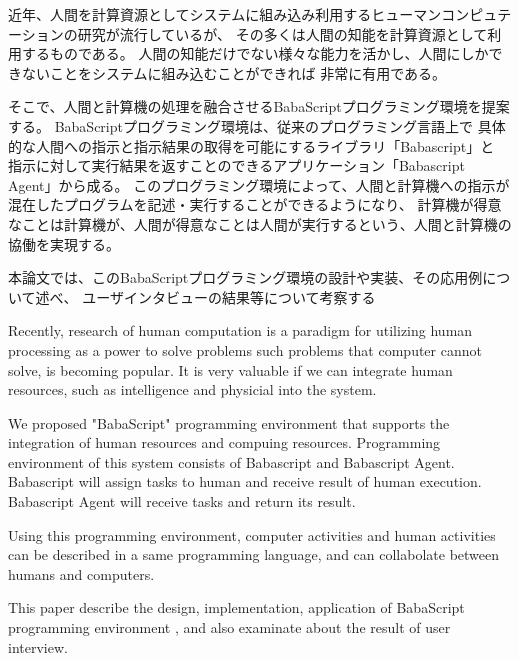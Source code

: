 \begin{jabstract}

近年、人間を計算資源としてシステムに組み込み利用するヒューマンコンピュテーションの研究が流行しているが、
その多くは人間の知能を計算資源として利用するものである。
人間の知能だけでない様々な能力を活かし、人間にしかできないことをシステムに組み込むことができれば
非常に有用である。

そこで、人間と計算機の処理を融合させるBabaScriptプログラミング環境を提案する。
BabaScriptプログラミング環境は、従来のプログラミング言語上で
具体的な人間への指示と指示結果の取得を可能にするライブラリ「Babascript」と
指示に対して実行結果を返すことのできるアプリケーション「Babascript Agent」から成る。
このプログラミング環境によって、人間と計算機への指示が混在したプログラムを記述・実行することができるようになり、
計算機が得意なことは計算機が、人間が得意なことは人間が実行するという、人間と計算機の協働を実現する。

本論文では、このBabaScriptプログラミング環境の設計や実装、その応用例について述べ、
ユーザインタビューの結果等について考察する

\end{jabstract}

\begin{eabstract}
Recently, research of human computation is a paradigm for utilizing human processing as a power to solve problems such problems that computer cannot solve, is becoming popular.
It is very valuable if we can integrate human resources, such as intelligence and physicial into the system.

We proposed "BabaScript" programming environment that supports the integration of human resources and compuing resources.
Programming environment of this system consists of Babascript and Babascript Agent.
Babascript will assign tasks to human and receive result of human execution.
Babascript Agent will receive tasks and return its result.

Using this programming environment, computer activities and human activities can be described
in a same programming language, and can collabolate between humans and computers.

This paper describe the design, implementation, application of BabaScript programming environment
, and also examinate about the result of user interview.

\end{eabstract}
